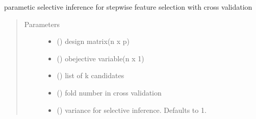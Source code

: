 \documentclass[letterpaper,10pt,english]{sphinxmanual}
\begin{document}
\begin{fulllineitems}
\label{\detokenize{selective:selective_inference.sfs_si.parametric_sfs_cv_si}}
parametic selective inference for stepwise feature selection with cross validation
\begin{quote}\begin{description}
\item[{Parameters}] \leavevmode\begin{itemize}
\item {} 
 () \textendash{} design matrix(n x p)

\item {} 
 () \textendash{} obejective variable(n x 1)

\item {} 
 (\sphinxstyleliteralemphasis{\sphinxupquote{{[}}}\sphinxstyleliteralemphasis{\sphinxupquote{{]}}}) \textendash{} list of k candidates

\item {} 
 () \textendash{} fold number in cross validation

\item {} 
 (\sphinxstyleliteralemphasis{\sphinxupquote{, }}) \textendash{} variance for selective inference. Defaults to 1.


\end{itemize}
\end{description}
\end{quote}
\end{fulllineitems}
\end{document}

